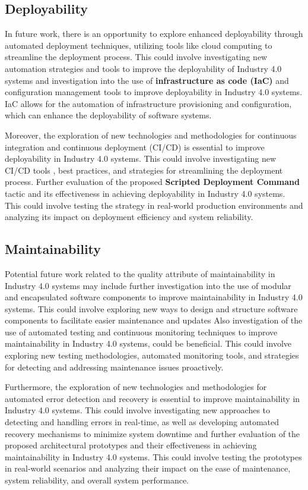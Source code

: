 \documentclass[conference]{IEEEtran}
\begin{document}
\subsection{Deployability}
In future work, there is an opportunity to explore enhanced deployability through automated deployment techniques, utilizing tools like cloud computing to streamline the deployment process. This could involve investigating new automation strategies and tools to improve the deployability of Industry 4.0 systems and investigation into the use of \textbf{infrastructure as code (IaC)} and configuration management tools \cite{8919181} to improve deployability in Industry 4.0 systems. IaC allows for the automation of infrastructure provisioning and configuration, which can enhance the deployability of software systems.

Moreover, the exploration of new technologies and methodologies for continuous integration and continuous deployment (CI/CD) is essential to improve deployability in Industry 4.0 systems. This could involve investigating new CI/CD tools \cite{7884954}, best practices, and strategies for streamlining the deployment process. Further evaluation of the proposed \textbf{Scripted Deployment Command} tactic and its effectiveness in achieving deployability in Industry 4.0 systems. This could involve testing the strategy in real-world production environments and analyzing its impact on deployment efficiency and system reliability.

\subsection{Maintainability}
 Potential future work related to the quality attribute of maintainability in Industry 4.0 systems may include further investigation into the use of modular and encapsulated software components to improve maintainability in Industry 4.0 systems. This could involve exploring new ways to design and structure software components to facilitate easier maintenance and updates Also investigation of the use of automated testing and continuous monitoring techniques \cite{LEE2006476} to improve maintainability in Industry 4.0 systems, could be beneficial. This could involve exploring new testing methodologies, automated monitoring tools, and strategies for detecting and addressing maintenance issues proactively.

 Furthermore, the exploration of new technologies and methodologies for automated error detection and recovery \cite{s20010109} is essential to improve maintainability in Industry 4.0 systems. This could involve investigating new approaches to detecting and handling errors in real-time, as well as developing automated recovery mechanisms to minimize system downtime and further evaluation of the proposed architectural prototypes and their effectiveness in achieving maintainability in Industry 4.0 systems. This could involve testing the prototypes in real-world scenarios and analyzing their impact on the ease of maintenance, system reliability, and overall system performance.
\end{document}
